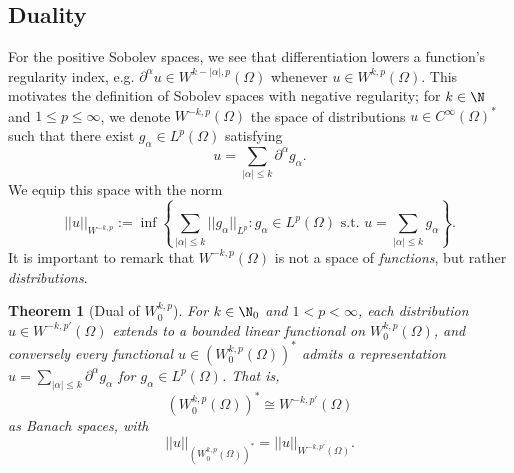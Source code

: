 \documentclass[reqno]{amsart}
\newtheorem{theorem}{Theorem}
\theoremstyle{definition}
\theoremstyle{remark}
\begin{document}
\subsection{Duality}

For the positive Sobolev spaces, we see that differentiation lowers a function's regularity index, e.g. $\partial^\alpha u \in W^{k - |\alpha|, p} (\Omega)$ whenever $u \in W^{k,p} (\Omega)$. This  motivates the definition of Sobolev spaces with negative regularity; for $k \in \N$ and $1 \leq p \leq \infty$, we denote $W^{-k, p} (\Omega)$ the space of distributions $u \in C^\infty (\Omega)^*$ such that there exist $g_\alpha \in L^p (\Omega)$ satisfying
	\[ u = \sum_{|\alpha| \leq k} \partial^\alpha g_\alpha. \]
We equip this space with the norm
	\[ || u||_{W^{-k, p}} := \inf \left\{ \sum_{|\alpha| \leq k} ||g_\alpha||_{L^p} : g_\alpha \in L^p (\Omega) \text{ s.t. } u = \sum_{|\alpha| \leq k} g_\alpha \right\} .\]	
It is important to remark that $W^{-k, p} (\Omega)$ is not a space of \textit{functions}, but rather \textit{distributions}. 

\begin{theorem}[Dual of $W^{k, p}_0$]
	For $k \in \N_0$ and $1 < p < \infty$, each distribution $u \in W^{-k, p'} (\Omega)$ extends to a bounded linear functional on $W^{k, p}_0 (\Omega)$, and conversely every functional $u \in (W^{k, p}_0 (\Omega))^*$ admits a representation $u =  \sum_{|\alpha| \leq k} \partial^\alpha g_\alpha$ for $g_\alpha \in L^p (\Omega)$. 
That is, 
		\[ (W^{k, p}_0 (\Omega))^* \cong W^{-k, p'} (\Omega) \]
	as Banach spaces, with
		\[ ||u||_{(W^{k, p}_0 (\Omega))^*} = ||u||_{W^{-k, p'} (\Omega)}. \]	
\end{theorem}
\end{document}
